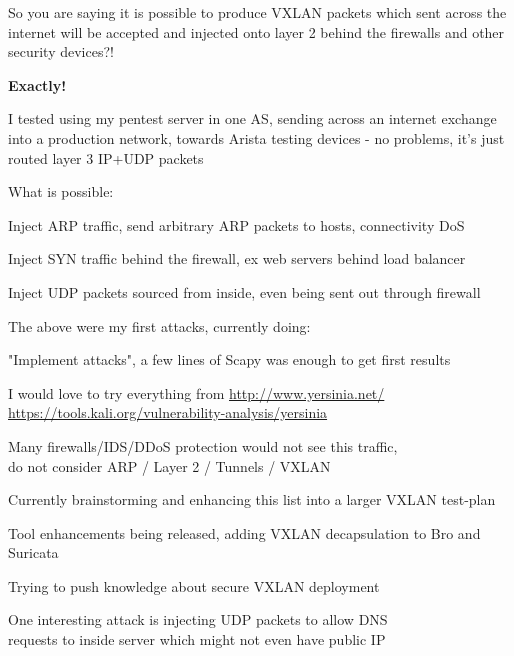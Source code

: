 \documentclass[Screen16to9,17pt,footrule]{foils}
\begin{document}
So you are saying it is possible to produce VXLAN packets which sent across the internet will be accepted and injected onto layer 2 behind the firewalls and other security devices?!

\vskip 1cm
{\bf\LARGE Exactly!}



I tested using my pentest server in one AS, sending across an internet exchange into a production network, towards Arista testing devices - no problems, it's just routed layer 3 IP+UDP packets


What is possible:
\begin{list2}
\item Inject ARP traffic, send arbitrary ARP packets to hosts, connectivity DoS
\item Inject SYN traffic behind the firewall, ex web servers behind load balancer
\item Inject UDP packets sourced from inside, even being sent out through firewall
\end{list2}
The above were my first attacks, currently doing:
\begin{list2}
\item "Implement attacks", a few lines of Scapy was enough to get first results \smiley
\item I would love to try everything from  \url{http://www.yersinia.net/}\\ \url{https://tools.kali.org/vulnerability-analysis/yersinia}
\item Many firewalls/IDS/DDoS protection would not see this traffic,\\
do not consider ARP / Layer 2 / Tunnels / VXLAN
\item Currently brainstorming and enhancing this list into a larger VXLAN test-plan
\item Tool enhancements being released, adding VXLAN decapsulation to Bro and Suricata
\item Trying to push knowledge about secure VXLAN deployment
\end{list2}



One interesting attack is injecting UDP packets to allow DNS\\
requests to inside server which might not even have public IP
\end{document}
